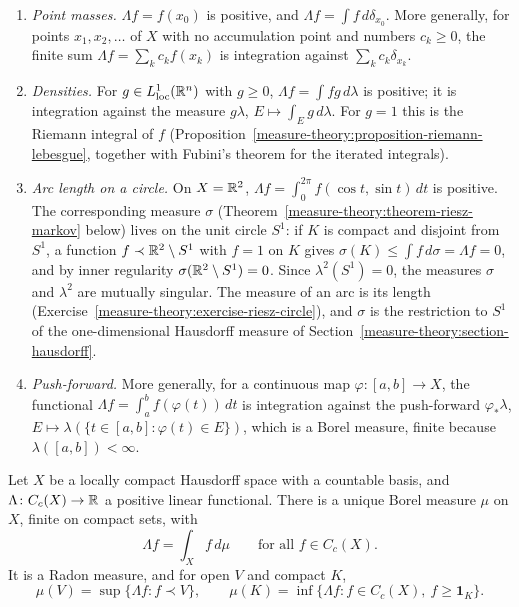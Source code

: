\begin{example}\label{measure-theory:example-positive-functionals}
\begin{enumerate}
\item \emph{Point masses.} $\Lambda f = f(x_0)$ is positive, and $\Lambda f = \int f\,d\delta_{x_0}$. More generally, for points $x_1, x_2, \ldots$ of $X$ with no accumulation point and numbers
$c_k \geq 0$, the finite sum $\Lambda f = \sum_kc_kf(x_k)$ is integration against $\sum_kc_k\delta_{x_k}$.
\item \emph{Densities.} For $g \in L^1_{\mathrm{loc}}(\mathbb{R}^n)$ with $g \geq 0$, $\Lambda f = \int fg\,d\lambda$ is positive; it is integration against the measure $g\lambda$, $E \mapsto \int_Eg\,d\lambda$. For
$g = 1$ this is the Riemann integral of $f$ (Proposition~\ref{measure-theory:proposition-riemann-lebesgue}, together with Fubini's theorem for the iterated integrals).
\item \emph{Arc length on a circle.} On $X = \mathbb{R}^2$, $\Lambda f = \int_0^{2\pi}f(\cos t, \sin t)\,dt$ is positive. The corresponding measure $\sigma$ (Theorem~\ref{measure-theory:theorem-riesz-markov}
below) lives on the unit circle $S^1$: if $K$ is compact and disjoint from $S^1$, a function $f \prec \mathbb{R}^2 \setminus S^1$ with $f = 1$ on $K$ gives $\sigma(K) \leq \int f\,d\sigma = \Lambda f = 0$, and
by inner regularity $\sigma(\mathbb{R}^2 \setminus S^1) = 0$. Since $\lambda^2(S^1) = 0$, the measures $\sigma$ and $\lambda^2$ are mutually singular. The measure of an arc is its length
(Exercise~\ref{measure-theory:exercise-riesz-circle}), and $\sigma$ is the restriction to $S^1$ of the one-dimensional Hausdorff measure of Section~\ref{measure-theory:section-hausdorff}.
\item \emph{Push-forward.} More generally, for a continuous map $\varphi \colon [a, b] \to X$, the functional $\Lambda f = \int_a^bf(\varphi(t))\,dt$ is integration against the push-forward
$\varphi_*\lambda$, $E \mapsto \lambda(\{t \in [a, b] : \varphi(t) \in E\})$, which is a Borel measure, finite because $\lambda([a, b]) < \infty$.
\end{enumerate}
\end{example}

\begin{theorem}\label{measure-theory:theorem-riesz-markov}
Let $X$ be a locally compact Hausdorff space with a countable basis, and $\Lambda \colon C_c(X) \to \mathbb{R}$ a positive linear functional. There is a unique Borel measure $\mu$ on $X$, finite on compact
sets, with
\[
\Lambda f = \int_Xf\,d\mu \qquad \text{for all } f \in C_c(X).
\]
It is a Radon measure, and for open $V$ and compact $K$,
\[
\mu(V) = \sup\{\Lambda f : f \prec V\}, \qquad \mu(K) = \inf\{\Lambda f : f \in C_c(X),\ f \geq \mathbf{1}_K\}.
\]
\end{theorem}

